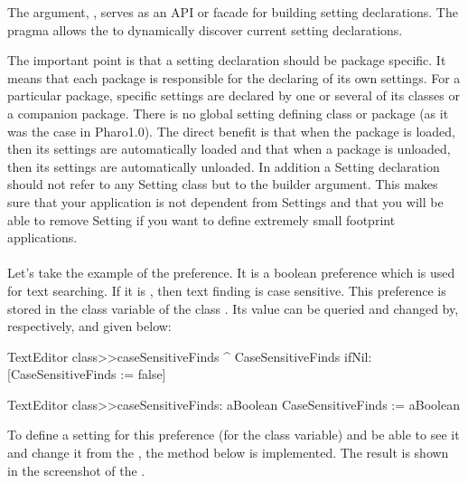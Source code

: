 \documentclass[a4paper,10pt,twoside]{book}
\begin{document}
The argument, , serves as an API or facade for building setting declarations. The pragma allows the \setbrowser to dynamically discover current setting declarations.

The important point is that a setting declaration should be package specific. It means that each package is responsible for the declaring of its own settings. For a particular package, specific settings are declared by one or several of its classes or a companion package. There is no global setting defining class or package (as it was the case in Pharo1.0). The direct benefit is that when the package is loaded, then its settings are automatically loaded and that when a package is unloaded, then its settings are automatically unloaded. In addition a Setting declaration should not refer to any Setting class but to the builder argument. This makes sure that your application is not dependent from Settings and that you will be able to remove Setting if you want to define extremely small footprint applications. 
\paragraph{}
Let's take the example of the  preference. It is a boolean preference which is used for text searching. If it is , then text finding is case sensitive. This preference is stored in the  class variable of the class . Its value can be queried and changed by, respectively,  and  given below:
\begin{code}{}
TextEditor class>>caseSensitiveFinds
	^ CaseSensitiveFinds ifNil: [CaseSensitiveFinds := false]

TextEditor class>>caseSensitiveFinds: aBoolean
	CaseSensitiveFinds := aBoolean
\end{code}
To define a setting for this preference (\ie for the  class variable) and be able to see it and change it from the \setbrowser, the method below is implemented. The result is shown in the screenshot of the . 
\end{document}
